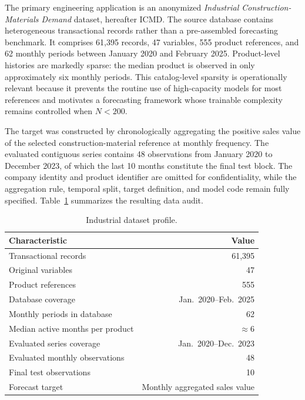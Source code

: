 The primary engineering application is an anonymized
\emph{Industrial Construction-Materials Demand} dataset, hereafter ICMD. The
source database contains heterogeneous transactional records rather than a
pre-assembled forecasting benchmark. It comprises 61,395 records, 47 variables,
555 product references, and 62 monthly periods between January 2020 and
February 2025. Product-level histories are markedly sparse: the median product
is observed in only approximately six monthly periods. This catalog-level
sparsity is operationally relevant because it prevents the routine use of
high-capacity models for most references and motivates a forecasting framework
whose trainable complexity remains controlled when $N<200$.

The target was constructed by chronologically aggregating the positive sales
value of the selected construction-material reference at monthly frequency.
The evaluated contiguous series contains 48 observations from January 2020 to
December 2023, of which the last 10 months constitute the final test block.
The company identity and product identifier are omitted for confidentiality,
while the aggregation rule, temporal split, target definition, and model code
remain fully specified. Table~\ref{tab:icmd_profile} summarizes the resulting
data audit.

\begin{table}[t]
\centering
\caption{Industrial dataset profile.}
\label{tab:icmd_profile}
\footnotesize
\setlength{\tabcolsep}{5pt}
\renewcommand{\arraystretch}{0.9999}
\begin{tabular}{|l|r|}
\hline
Characteristic & Value \\
\hline
Transactional records & 61,395 \\
\hline
Original variables & 47 \\
\hline
Product references & 555 \\
\hline
Database coverage & Jan.\ 2020--Feb.\ 2025 \\
\hline
Monthly periods in database & 62 \\
\hline
Median active months per product & $\approx 6$ \\
\hline
Evaluated series coverage & Jan.\ 2020--Dec.\ 2023 \\
\hline
Evaluated monthly observations & 48 \\
\hline
Final test observations & 10 \\
\hline
Forecast target & Monthly aggregated sales value \\
\hline
\end{tabular}
\end{table}

